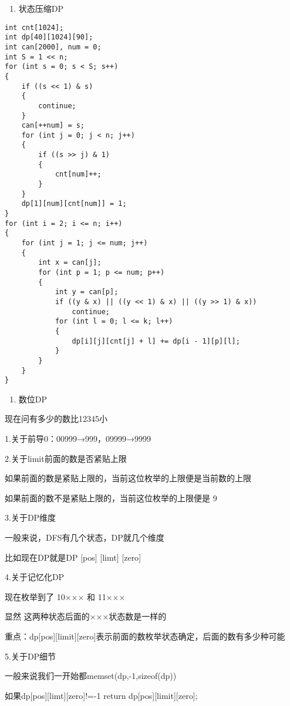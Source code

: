 \documentclass[]{article}
\providecommand{\tightlist}{%
  \setlength{\itemsep}{0pt}\setlength{\parskip}{0pt}}
\begin{document}
\begin{enumerate}
\def\labelenumi{\arabic{enumi}.}
\setcounter{enumi}{1}
\tightlist
\item
  状态压缩DP
\end{enumerate}

\begin{verbatim}
int cnt[1024];
int dp[40][1024][90];
int can[2000], num = 0;
int S = 1 << n;
for (int s = 0; s < S; s++)
{
    if ((s << 1) & s)
    {
        continue;
    }
    can[++num] = s;
    for (int j = 0; j < n; j++)
    {
        if ((s >> j) & 1)
        {
            cnt[num]++;
        }
    }
    dp[1][num][cnt[num]] = 1;
}
for (int i = 2; i <= n; i++)
{
    for (int j = 1; j <= num; j++)
    {
        int x = can[j];
        for (int p = 1; p <= num; p++)
        {
            int y = can[p];
            if ((y & x) || ((y << 1) & x) || ((y >> 1) & x))
                continue;
            for (int l = 0; l <= k; l++)
            {
                dp[i][j][cnt[j] + l] += dp[i - 1][p][l];
            }
        }
    }
}
\end{verbatim}

\begin{enumerate}
\def\labelenumi{\arabic{enumi}.}
\setcounter{enumi}{2}
\tightlist
\item
  数位DP
\end{enumerate}

现在问有多少的数比12345小

1.关于前导0：00999→999，09999→9999

2.关于limit前面的数是否紧贴上限

如果前面的数是紧贴上限的，当前这位枚举的上限便是当前数的上限

如果前面的数不是紧贴上限的，当前这位枚举的上限便是 9

3.关于DP维度

一般来说，DFS有几个状态，DP就几个维度　　

比如现在DP就是DP {[}pos{]} {[}limt{]} {[}zero{]}

4.关于记忆化DP

现在枚举到了 10××× 和 11×××

显然 这两种状态后面的×××状态数是一样的

重点：dp{[}pos{]}{[}limit{]}{[}zero{]}表示前面的数枚举状态确定，后面的数有多少种可能

5.关于DP细节

一般来说我们一开始都memset(dp,-1,sizeof(dp))

如果dp{[}pos{]}{[}limt{]}{[}zero{]}!=-1 return
dp{[}pos{]}{[}limit{]}{[}zero{]};
\end{document}
